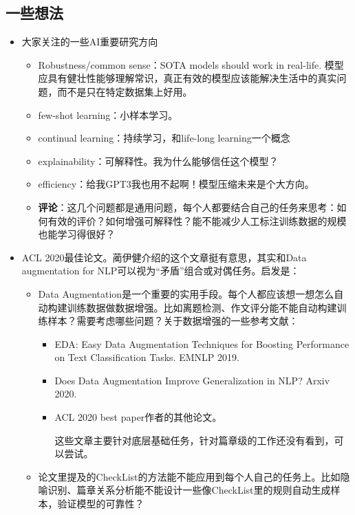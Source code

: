 \documentclass[11pt]{article}
\begin{document}
\begin{CJK}{UTF8}{gkai}
\subsection{一些想法}

\begin{itemize}
\item 大家关注的一些AI重要研究方向
\begin{itemize}
\item Robustness/common sense：SOTA models should work in real-life. 模型应具有健壮性能够理解常识，真正有效的模型应该能解决生活中的真实问题，而不是只在特定数据集上好用。
\item few-shot learning：小样本学习。
\item continual learning：持续学习，和life-long learning一个概念
\item explainability：可解释性。我为什么能够信任这个模型？
\item efficiency：给我GPT3我也用不起啊！模型压缩未来是个大方向。
\item \textbf{评论}：这几个问题都是通用问题，每个人都要结合自己的任务来思考：如何有效的评价？如何增强可解释性？能不能减少人工标注训练数据的规模也能学习得很好？
\end{itemize}
\item ACL 2020最佳论文。蔺伊健介绍的这个文章挺有意思，其实和Data augmentation for NLP可以视为“矛盾”组合或对偶任务。启发是：
\begin{itemize}
\item Data Augmentation是一个重要的实用手段。每个人都应该想一想怎么自动构建训练数据做数据增强。比如离题检测、作文评分能不能自动构建训练样本？需要考虑哪些问题？关于数据增强的一些参考文献：
\begin{itemize}
\item EDA: Easy Data Augmentation Techniques for Boosting Performance on Text Classification Tasks. EMNLP 2019.
\item Does Data Augmentation Improve Generalization in NLP? Arxiv 2020.
\item ACL 2020 best paper作者的其他论文。

这些文章主要针对底层基础任务，针对篇章级的工作还没有看到，可以尝试。
\end{itemize}
\item 论文里提及的CheckList的方法能不能应用到每个人自己的任务上。比如隐喻识别、篇章关系分析能不能设计一些像CheckList里的规则自动生成样本，验证模型的可靠性？
\end{itemize}
\end{itemize}


\end{CJK}
\end{document}
